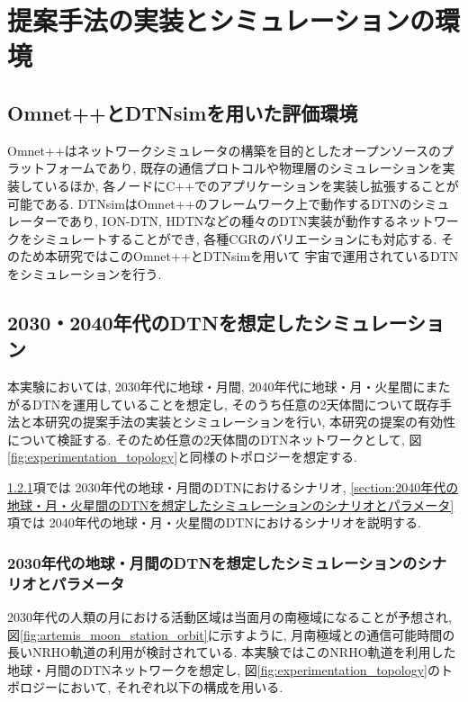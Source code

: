 \chapter{提案手法の実装とシミュレーションの環境}
\label{chap:implementation_and_experimentation}

\section{Omnet++とDTNsimを用いた評価環境}
\label{section:Omnet++とDTNsimを用いた評価環境}
Omnet++はネットワークシミュレータの構築を目的としたオープンソースのプラットフォームであり, 
既存の通信プロトコルや物理層のシミュレーションを実装しているほか, 
各ノードにC++でのアプリケーションを実装し拡張することが可能である. 
DTNsimはOmnet++のフレームワーク上で動作するDTNのシミュレーターであり, 
ION-DTN, HDTNなどの種々のDTN実装が動作するネットワークをシミュレートすることができ, 
各種CGRのバリエーションにも対応する. そのため本研究ではこのOmnet++とDTNsimを用いて
宇宙で運用されているDTNをシミュレーションを行う. 

\section{2030・2040年代のDTNを想定したシミュレーション}
\label{section:2030・2040年代のDTNを想定したシミュレーション}
本実験においては, 2030年代に地球・月間, 2040年代に地球・月・火星間にまたがるDTNを運用していることを想定し, 
そのうち任意の2天体間について既存手法と本研究の提案手法の実装とシミュレーションを行い, 
本研究の提案の有効性について検証する. そのため任意の2天体間のDTNネットワークとして, 
図\ref{fig:experimentation_topology}と同様のトポロジーを想定する. 

\ref{section:2030年代の地球・月間のDTNを想定したシミュレーションのシナリオとパラメータ}項では
2030年代の地球・月間のDTNにおけるシナリオ, 
\ref{section:2040年代の地球・月・火星間のDTNを想定したシミュレーションのシナリオとパラメータ}項では
2040年代の地球・月・火星間のDTNにおけるシナリオを説明する. 

\subsection{2030年代の地球・月間のDTNを想定したシミュレーションのシナリオとパラメータ}
\label{section:2030年代の地球・月間のDTNを想定したシミュレーションのシナリオとパラメータ}
2030年代の人類の月における活動区域は当面月の南極域になることが予想され, 
図\ref{fig:artemis_moon_station_orbit}に示すように, 
月南極域との通信可能時間の長いNRHO軌道の利用が検討されている. 
本実験ではこのNRHO軌道を利用した地球・月間のDTNネットワークを想定し, 
図\ref{fig:experimentation_topology}のトポロジーにおいて, 
それぞれ以下の構成を用いる. 

